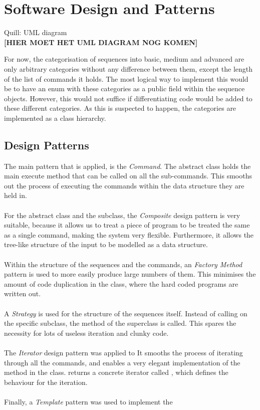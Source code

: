 \chapter{Software Design and Patterns}
Quill: UML diagram\\

\textbf{[HIER MOET HET UML DIAGRAM NOG KOMEN]}

For now, the categorisation of sequences into basic, medium and advanced are only arbitrary categories without any difference between them, except the length of the list of commands it holds. The most logical way to implement this would be to have an enum with these categories as a public field within the sequence objects. However, this would not suffice if differentiating code would be added to these different categories. As this is suspected to happen, the categories are implemented as a class hierarchy. 

\section{Design Patterns}
The main pattern that is applied, is the \textit{Command}. The  abstract class holds the main execute method that can be called on all the sub-commands. This smooths out the process of executing the commands within the data structure they are held in. \\~\\

For the  abstract class and the  subclass, the \textit{Composite} design pattern is very suitable, because it allows us to treat a piece of program to be treated the same as a single command, making the system very flexible. Furthermore, it allows the tree-like structure of the input to be modelled as a data structure. \\~\\

Within the structure of the sequences and the commands, an \textit{Factory Method} pattern is used to more easily produce large numbers of them. This minimises the amount of code duplication in the  class, where the hard coded programs are written out.\\~\\

A \textit{Strategy} is used for the structure of the sequences itself. Instead of calling on the specific subclass, the  method of the superclass is called. This spares the necessity for lots of useless iteration and clunky code. \\~\\

The \textit{Iterator} design pattern was applied to It smooths the process of iterating through all the commands, and enables a very elegant implementation of the  method in the  class.  returns a concrete iterator called , which defines the behaviour for the iteration. \\~\\

Finally, a \textit{Template} pattern was used to implement the 